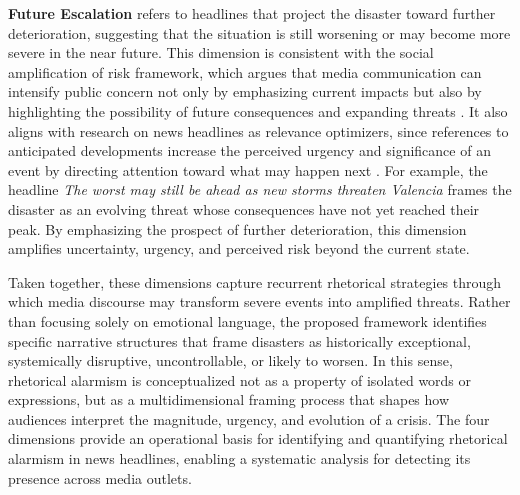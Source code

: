 \textbf{Future Escalation} refers to headlines that project the disaster toward further deterioration, 
suggesting that the situation is still worsening or may become more severe in the near future. This dimension is consistent with the social
amplification of risk framework, which argues that media communication can intensify public concern not only by 
emphasizing current impacts but also by highlighting the possibility of future consequences and expanding threats \parencite{amplification_risk}. 
It also aligns with research on news headlines as relevance optimizers, since references to anticipated 
developments increase the perceived urgency and significance of an event by directing attention toward what 
may happen next \parencite{Dor_Relevance_Opti,pragma_linguistic}. For example, the headline \emph{The worst may still be ahead as new storms threaten Valencia} 
frames the disaster as an evolving threat whose consequences have not yet reached their peak. 
By emphasizing the prospect of further deterioration, this dimension amplifies uncertainty, urgency, and perceived risk beyond the current state.

Taken together, these dimensions capture recurrent rhetorical strategies through which media discourse may transform severe events into amplified threats. 
Rather than focusing solely on emotional language, the proposed framework identifies specific narrative structures that frame disasters as 
historically exceptional, systemically disruptive, uncontrollable, or likely to worsen. In this sense, rhetorical alarmism is conceptualized not as a 
property of isolated words or expressions, but as a multidimensional framing process that shapes how audiences interpret the magnitude, 
urgency, and evolution of a crisis. The four dimensions provide an operational basis for identifying and quantifying rhetorical 
alarmism in news headlines, enabling a systematic analysis for detecting its presence across media outlets.
